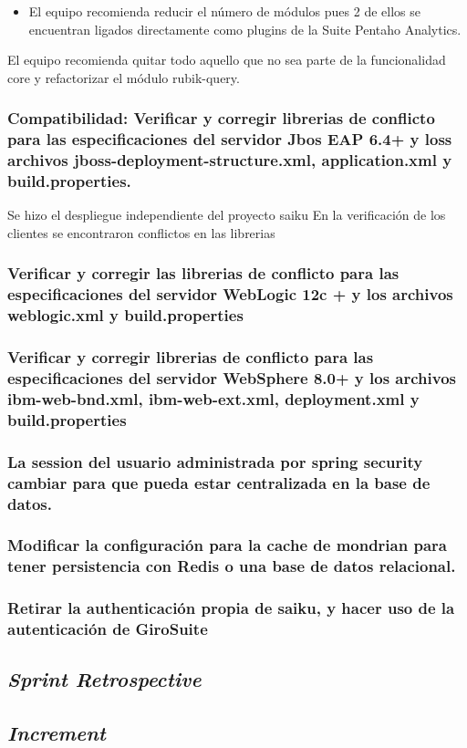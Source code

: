 \begin{spacing}{1.5}
\begin{itemize}
			\item El equipo recomienda reducir el n\'{u}mero de m\'{o}dulos pues 2 de ellos se encuentran ligados directamente como plugins de la Suite Pentaho Analytics.
		\end{itemize}
		
		El equipo recomienda quitar todo aquello que no sea parte de la funcionalidad core y refactorizar el m\'{o}dulo rubik-query.
		
		
		\subsubsection{Compatibilidad: Verificar y corregir librerias de conflicto para las especificaciones del servidor Jbos EAP 6.4+ y loss archivos jboss-deployment-structure.xml, application.xml y build.properties.}
		
		
		Se hizo el despliegue independiente del proyecto saiku
		En la verificaci\'{o}n de los clientes se encontraron conflictos en las librerias 
		
		\subsubsection{Verificar y corregir las librerias de conflicto para las especificaciones del servidor WebLogic 12c + y los archivos weblogic.xml y build.properties}
		\subsubsection{Verificar y corregir librerias de conflicto para las especificaciones del servidor WebSphere 8.0+ y los archivos ibm-web-bnd.xml, ibm-web-ext.xml, deployment.xml y build.properties}
		\subsubsection{La session del usuario administrada por spring security cambiar para que pueda estar centralizada en la base de datos.}
		\subsubsection{Modificar la configuración para la cache de mondrian para tener persistencia con Redis o una base de datos relacional.}
		
		\subsubsection{Retirar la authenticación propia de saiku, y hacer uso de la autenticación de GiroSuite}
		
	\subsection{\textit{Sprint Retrospective}}
	
	\subsection{\textit{Increment}}
\end{spacing}